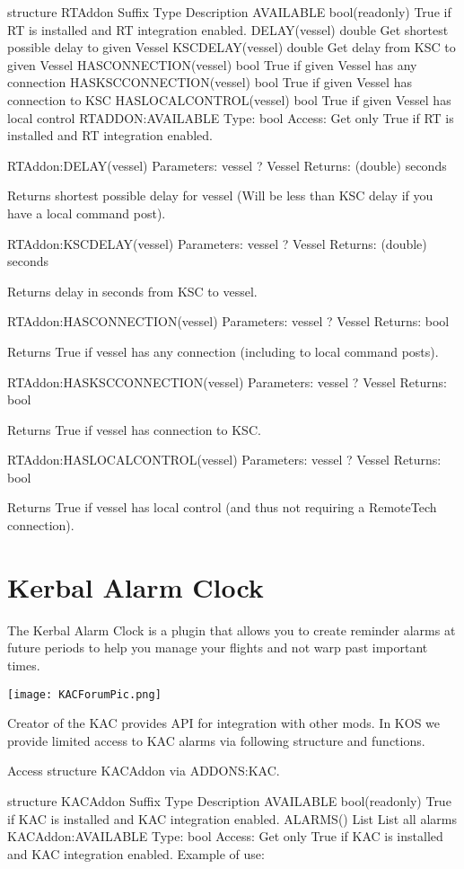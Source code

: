 structure RTAddon
Suffix	Type	Description
AVAILABLE	bool(readonly)	True if RT is installed and RT integration enabled.
DELAY(vessel)	double	Get shortest possible delay to given Vessel
KSCDELAY(vessel)	double	Get delay from KSC to given Vessel
HASCONNECTION(vessel)	bool	True if given Vessel has any connection
HASKSCCONNECTION(vessel)	bool	True if given Vessel has connection to KSC
HASLOCALCONTROL(vessel)	bool	True if given Vessel has local control
RTADDON:AVAILABLE
Type:	bool
Access:	Get only
True if RT is installed and RT integration enabled.

RTAddon:DELAY(vessel)
Parameters:	
vessel ? Vessel
Returns:	
(double) seconds

Returns shortest possible delay for vessel (Will be less than KSC delay if you have a local command post).

RTAddon:KSCDELAY(vessel)
Parameters:	
vessel ? Vessel
Returns:	
(double) seconds

Returns delay in seconds from KSC to vessel.

RTAddon:HASCONNECTION(vessel)
Parameters:	
vessel ? Vessel
Returns:	
bool

Returns True if vessel has any connection (including to local command posts).

RTAddon:HASKSCCONNECTION(vessel)
Parameters:	
vessel ? Vessel
Returns:	
bool

Returns True if vessel has connection to KSC.

RTAddon:HASLOCALCONTROL(vessel)
Parameters:	
vessel ? Vessel
Returns:	
bool

Returns True if vessel has local control (and thus not requiring a RemoteTech connection).
	\section{Kerbal Alarm Clock}%
	The Kerbal Alarm Clock is a plugin that allows you to create reminder alarms at future periods to help you manage your flights and not warp past important times.

\begin{center}
\texttt{[image: KACForumPic.png]}
\end{center}

Creator of the KAC provides API for integration with other mods. In KOS we provide limited access to KAC alarms via following structure and functions.

Access structure KACAddon via ADDONS:KAC.

structure KACAddon
Suffix	Type	Description
AVAILABLE	bool(readonly)	True if KAC is installed and KAC integration enabled.
ALARMS()	List	List all alarms
KACAddon:AVAILABLE
Type:	bool
Access:	Get only
True if KAC is installed and KAC integration enabled. Example of use:

